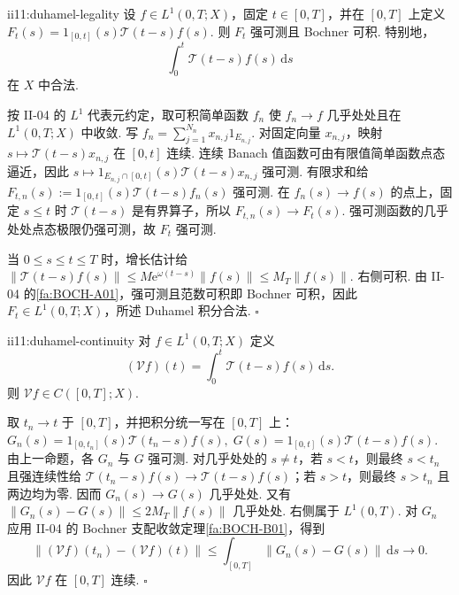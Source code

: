 \begin{FAProposition}{ii11:duhamel-legality}
设 \(\displaystyle f\in L^1(0,T;X)\)，固定 \(\displaystyle t\in[0,T]\)，并在 \(\displaystyle[0,T]\) 上定义 \(\displaystyle F_t(s) = 1_{[0,t]}(s)\mathcal T(t-s)f(s).\)
则 \(\displaystyle F_t\) 强可测且 Bochner 可积. 特别地，
\[
\int_0^t\mathcal T(t-s)f(s)\,\mathrm{d}s
\]
在 \(\displaystyle X\) 中合法.
\end{FAProposition}

\begin{FAProof}
按 II-04 的 \(\displaystyle L^1\) 代表元约定，取可积简单函数 \(\displaystyle f_n\) 使 \(\displaystyle f_n\to f\) 几乎处处且在 \(\displaystyle L^1(0,T;X)\) 中收敛. 写 \(\displaystyle f_n=\sum_{j=1}^{N_n}x_{n,j}1_{E_{n,j}}\). 对固定向量 \(\displaystyle x_{n,j}\)，映射 \(\displaystyle s\mapsto\mathcal T(t-s)x_{n,j}\) 在 \(\displaystyle[0,t]\) 连续. 连续 Banach 值函数可由有限值简单函数点态逼近，因此 \(\displaystyle s\mapsto 1_{E_{n,j}\cap[0,t]}(s)\mathcal T(t-s)x_{n,j}\)
强可测. 有限求和给 \(\displaystyle F_{t,n}(s) := 1_{[0,t]}(s)\mathcal T(t-s)f_n(s)\)
强可测. 在 \(\displaystyle f_n(s)\to f(s)\) 的点上，固定 \(\displaystyle s\leqslant t\) 时 \(\displaystyle\mathcal T(t-s)\) 是有界算子，所以 \(\displaystyle F_{t,n}(s)\to F_t(s)\). 强可测函数的几乎处处点态极限仍强可测，故 \(\displaystyle F_t\) 强可测.

当 \(\displaystyle0\leqslant s\leqslant t\leqslant T\) 时，增长估计给 \(\displaystyle \|\mathcal T(t-s)f(s)\| \leqslant M\mathrm{e}^{\omega(t-s)}\|f(s)\| \leqslant M_T\|f(s)\|.\)
右侧可积. 由 II-04 的\autoref{fa:BOCH-A01}，强可测且范数可积即 Bochner 可积，因此 \(\displaystyle F_t\in L^1(0,T;X)\)，所述 Duhamel 积分合法.
\hfill\(\square\)
\end{FAProof}

\begin{FAProposition}{ii11:duhamel-continuity}
对 \(\displaystyle f\in L^1(0,T;X)\) 定义
\[
(\mathcal Vf)(t)
=
\int_0^t\mathcal T(t-s)f(s)\,\mathrm{d}s.
\]
则 \(\displaystyle\mathcal Vf\in C([0,T];X)\).
\end{FAProposition}

\begin{FAProof}
取 \(\displaystyle t_n\to t\) 于 \(\displaystyle[0,T]\)，并把积分统一写在 \(\displaystyle[0,T]\) 上： \(\displaystyle G_n(s) = 1_{[0,t_n]}(s)\mathcal T(t_n-s)f(s), \; G(s) = 1_{[0,t]}(s)\mathcal T(t-s)f(s).\)
由上一命题，各 \(\displaystyle G_n\) 与 \(\displaystyle G\) 强可测. 对几乎处处的 \(\displaystyle s\neq t\)，若 \(\displaystyle s<t\)，则最终 \(\displaystyle s<t_n\) 且强连续性给 \(\displaystyle\mathcal T(t_n-s)f(s)\to\mathcal T(t-s)f(s)\)；若 \(\displaystyle s>t\)，则最终 \(\displaystyle s>t_n\) 且两边均为零. 因而 \(\displaystyle G_n(s)\to G(s)\) 几乎处处. 又有 \(\displaystyle \|G_n(s)-G(s)\| \leqslant 2M_T\|f(s)\|\)
几乎处处. 右侧属于 \(\displaystyle L^1(0,T)\). 对 \(\displaystyle G_n\) 应用 II-04 的 Bochner 支配收敛定理\autoref{fa:BOCH-B01}，得到
\[
\left\|
(\mathcal Vf)(t_n)-(\mathcal Vf)(t)
\right\|
\leqslant
\int_{[0,T]}\|G_n(s)-G(s)\|\,\mathrm{d}s
\longrightarrow0.
\]
因此 \(\displaystyle\mathcal Vf\) 在 \(\displaystyle[0,T]\) 连续.
\hfill\(\square\)
\end{FAProof}

